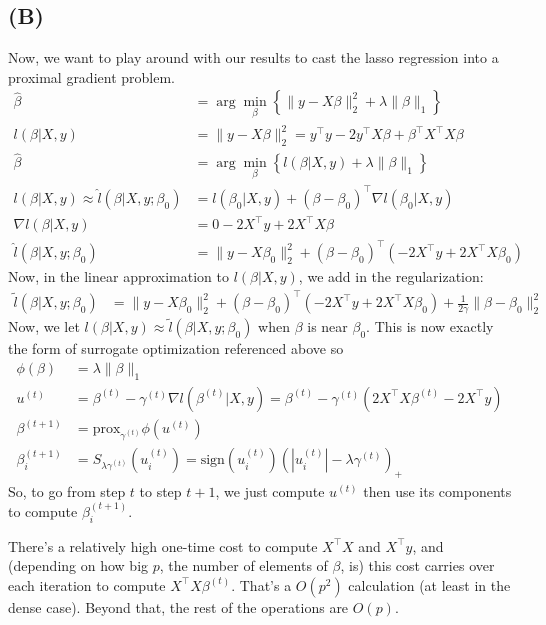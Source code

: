 \documentclass{article}
\begin{document}
\subsection{(B)}
Now, we want to play around with our results to cast the lasso regression into a proximal gradient problem.
\begin{align*}
\hat{\beta}&=\arg\min_\beta \left\{\lVert y-X\beta\rVert_2^2 + \lambda \lVert \beta\rVert_1\right\}\\
l(\beta | X,y)&=\lVert y-X\beta\rVert_2^2=y^\top y - 2y^\top X\beta + \beta^\top X^\top X \beta\\
\hat{\beta}&=\arg\min_\beta \left\{l(\beta | X,y)+ \lambda \lVert \beta\rVert_1\right\}\\
l(\beta | X,y)\approx\hat{l}(\beta | X,y ; \beta_0)&= l(\beta_0 | X, y) + (\beta-\beta_0)^\top \nabla l(\beta_0 | X, y)\\
\nabla l(\beta | X, y)&=0 -2X^\top y + 2X^\top X\beta\\
\hat{l}(\beta | X,y ; \beta_0)&=\lVert y-X\beta_0\rVert_2^2 + (\beta-\beta_0)^\top \left(-2X^\top y + 2X^\top X\beta_0\right)
\end{align*}
Now, in the linear approximation to $l(\beta | X,y)$, we add in the regularization:
\begin{align*}
\tilde{l}(\beta | X,y ; \beta_0)&=\lVert y-X\beta_0\rVert_2^2 + (\beta-\beta_0)^\top \left(-2X^\top y + 2X^\top X\beta_0\right)+\frac{1}{2\gamma}\lVert \beta-\beta_0\rVert_2^2
\end{align*}
Now, we let $l(\beta|X, y)\approx \tilde l(\beta | X,y ;\beta_0)$ when $\beta$ is near $\beta_0$.
This is now exactly the form of surrogate optimization referenced above so
\begin{align*}
\phi(\beta)&=\lambda \lVert \beta \rVert_1\\
u^{(t)}&=\beta^{(t)}-\gamma^{(t)} \nabla l(\beta^{(t)} | X, y)= \beta^{(t)} - \gamma^{(t)}\left(2X^\top X\beta^{(t)}-2X^\top y\right)\\
\beta^{(t+1)}&=\textrm{prox}_{\gamma^{(t)}} \phi(u^{(t)})\\
\beta_i^{(t+1)}&=S_{\lambda\gamma^{(t)}}\left(u_i^{(t)}\right)=\textrm{sign}\left(u_i^{(t)}\right)\left(\left|u_i^{(t)}\right|-\lambda\gamma^{(t)}\right)_+
\end{align*}
So, to go from step $t$ to step $t+1$, we just compute $u^{(t)}$ then use its components to compute $\beta_i^{(t+1)}$.

There's a relatively high one-time cost to compute $X^\top X$ and $X^\top y$, and (depending on how big $p$, the number of elements of $\beta$, is) this cost carries over each iteration to compute $X^\top X \beta^{(t)}$. That's a $O(p^2)$ calculation (at least in the dense case). Beyond that, the rest of the operations are $O(p)$.
\end{document}
